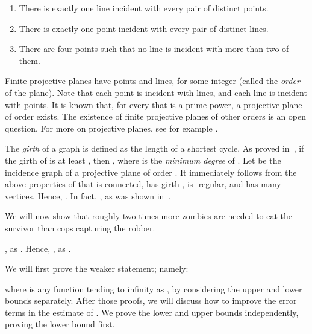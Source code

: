 \documentclass[12pt]{amsart}
\begin{document}
\begin{enumerate}
\item There is exactly one line incident with every pair of distinct points.

\item There is exactly one point incident with every pair of distinct lines.

\item There are four points such that no line is incident with more than two of them.
\end{enumerate}
Finite projective planes have  points and  lines, for some integer  (called the \emph{order} of the plane). Note that each point is incident with  lines, and each line is incident with  points.
It is known that, for every  that is a prime power, a projective plane  of order  exists. The existence of finite projective planes of other orders is an open question. For more on projective planes, see for example \cite{dem}.

\bigskip

The \emph{girth} of a graph  is defined as the length of a shortest cycle. As proved in~\cite{af}, if the girth of  is at least , then , where  is the
\emph{minimum degree} of . Let  be the incidence graph of a projective plane of order . It immediately follows from the above properties of  that  is connected, has girth , is -regular, and has  many vertices. Hence, . In fact, , as was shown in~\cite{p}.

\medskip

We will now show that roughly two times more zombies are needed to eat the survivor than cops capturing the robber.

\begin{theorem}\label{proj}
, as . Hence, , as .
\end{theorem}

\noindent
We will first prove the weaker statement; namely:

where  is any function tending to infinity as ,
by considering the upper and lower bounds separately.
After those proofs, we will discuss how to improve the error terms in the estimate of . We prove the lower and upper bounds independently, proving the lower bound first.
\end{document}
